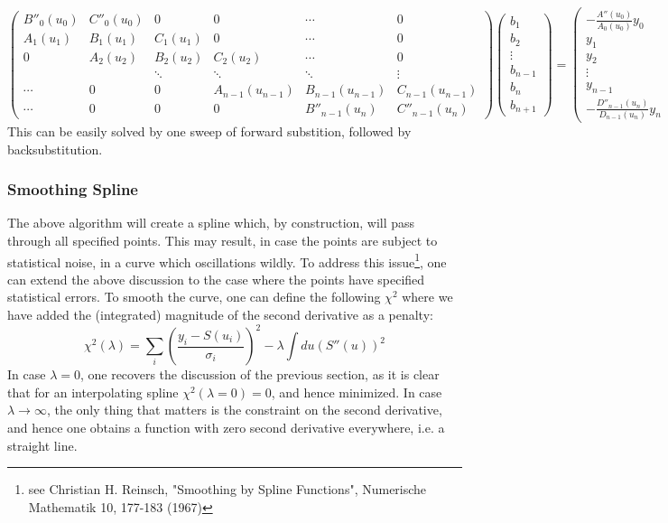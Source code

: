 \documentclass[a4paper,10pt,twosided]{article}
\begin{document}
\begin{equation}
   \left( \begin{array}{ccccccccccccc}  
       B''_0(u_0) & C''_0(u_0)  & 0 & 0  &  \cdots & 0
  \\   A_1(u_1) & B_1(u_1) & C_1(u_1) & 0        &  \cdots & 0 
  \\   0        & A_2(u_2) & B_2(u_2) & C_2(u_2) &  \cdots & 0 
  \\            &          & \ddots   & \ddots   & \ddots   & \vdots
  \\    \cdots & 0 & 0 & A_{n-1}(u_{n-1}) & B_{n-1}(u_{n-1}) & C_{n-1}(u_{n-1})
  \\   \cdots  & 0& 0  & 0 &  B''_{n-1}(u_n) & C''_{n-1}(u_n) 
    \end{array} \right) 
   \left( \begin{array}{c}  b_1 \\ b_2 \\ \vdots \\ b_{n-1} \\ b_n \\ b_{n+1}  \end{array}  \right) 
   = \left( \begin{array}{c} -\frac{A''(u_0)}{A_0(u_0)} y_0  \\ y_1 \\ y_2 \\ \vdots \\ y_{n-1} \\ -\frac{D''_{n-1}(u_n)}{D_{n-1}(u_n)} y_n         \end{array}\right)
\end{equation}
This can be easily solved by one sweep of forward substition, followed by backsubstitution.

\subsubsection{Smoothing Spline}
The above algorithm will create a spline which, by construction, will pass through all specified points.
This may result, in case the points are subject to statistical noise, in a curve which oscillations wildly.
To address this issue\footnote{see Christian H. Reinsch, "Smoothing by Spline Functions", Numerische Mathematik 10, 177-183 (1967)}, one can extend the above discussion to the case where the points have specified
statistical errors. To smooth the curve, one can define the following $\chi^2$ where we have added the
(integrated) magnitude of the second derivative as a penalty:
\begin{equation}
     \chi^2(\lambda) = \sum_i \left( \frac{y_i-S(u_i)}{\sigma_i} \right)^2 - \lambda \int du \left( S''(u) \right)^2
\end{equation}
In case $\lambda=0$, one recovers the discussion of the previous section, as it is clear that for an
interpolating spline $\chi^2(\lambda=0) = 0$, and hence minimized. In case $\lambda\to\infty$, the
only thing that matters is the constraint on the second derivative, and hence one obtains a function
with zero second derivative everywhere, i.e. a straight line.
\end{document}
